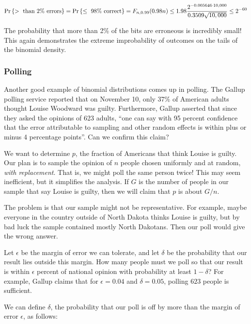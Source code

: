 \documentclass[11pt,twoside]{article}
\begin{document}
\begin{equation*}
\mathop{\textup{Pr}}\nolimits\left\{> \mbox{ than 2\% errors}\right\}
    =  \mathop{\textup{Pr}}\nolimits\left\{\leq \mbox{ 98\% correct}\right\} 
    =  F_{n, 0.99}(0.98n) 
    \leq  1.98 \frac{2^{-0.005646 \cdot 10,000}}{0.3509 \sqrt{10,000}}
    \leq  2^{-60}
\end{equation*}

The probability that more than 2\% of the bits are erroneous is
incredibly small!  This again demonstrates the extreme improbability
of outcomes on the tails of the binomial density.
\iffalse

\subsubsection{Polling}

Another good example of binomial distributions comes up in polling.
The Gallup polling service reported that on November 10, only 37\% of
American adults thought Louise Woodward was guilty.  Furthermore,
Gallup asserted that since they asked the opinions of 623 adults,
``one can say with 95 percent confidence that the error attributable
to sampling and other random effects is within plus or minus 4
percentage points''.  Can we confirm this claim?

We want to determine $p$, the fraction of Americans that think Louise
is guilty.  Our plan is to sample the opinion of $n$ people chosen
uniformly and at random, {\em with replacement}.  That is, we might
poll the same person twice!  This may seem inefficient, but it
simplifies the analysis.  If $G$ is the number of people in our sample
that say Louise is guilty, then we will claim that $p$ is about
$G/n$.

The problem is that our sample might not be representative.  For
example, maybe everyone in the country outside of North Dakota thinks
Louise is guilty, but by bad luck the sample contained mostly North
Dakotans.  Then our poll would give the wrong answer.

Let $\epsilon$ be the margin of error we can tolerate, and let
$\delta$ be the probability that our result lies outside this margin.
How many people must we poll so that our result is within $\epsilon$
percent of national opinion with probability at least $1-\delta$?  For
example, Gallup claims that for $\epsilon = 0.04$ and $\delta = 0.05$,
polling $623$ people is sufficient.

We can define $\delta$, the probability that our poll is off by more
than the margin of error $\epsilon$, as follows:
\end{document}

